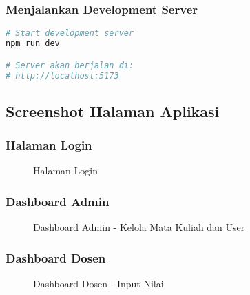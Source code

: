 \documentclass[12pt,a4paper]{article}
\begin{document}
\subsubsection{Menjalankan Development Server}

\begin{lstlisting}[language=bash]
# Start development server
npm run dev

# Server akan berjalan di:
# http://localhost:5173
\end{lstlisting}

\subsection{Screenshot Halaman Aplikasi}

\subsubsection{Halaman Login}

\begin{figure}[H]
\centering
{}
\caption{Halaman Login}
\end{figure}

\subsubsection{Dashboard Admin}

\begin{figure}[H]
\centering
{}
\caption{Dashboard Admin - Kelola Mata Kuliah dan User}
\end{figure}

\subsubsection{Dashboard Dosen}

\begin{figure}[H]
\centering
{}
\caption{Dashboard Dosen - Input Nilai}
\end{figure}
\end{document}
